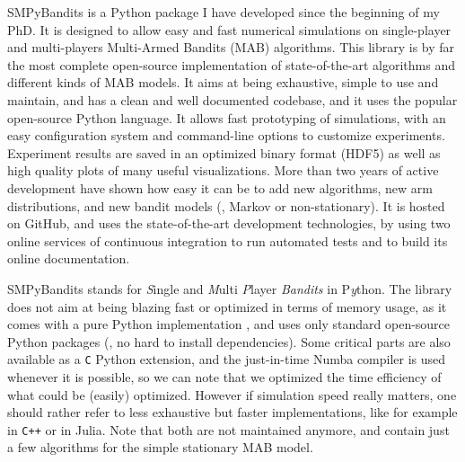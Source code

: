 SMPyBandits is a Python package I have developed since the beginning of my PhD.
It is designed to allow easy and fast numerical simulations on single-player and multi-players Multi-Armed Bandits (MAB) algorithms.
This library is by far the most complete open-source implementation of state-of-the-art algorithms and different kinds of MAB models.
It aims at being exhaustive, simple to use and maintain, and has a clean and well documented codebase, and it uses the popular open-source Python language.
It allows fast prototyping of simulations, with an easy configuration system and command-line options to customize experiments.
Experiment results are saved in an optimized binary format (HDF5) as well as high quality plots of many useful visualizations.
%
More than two years of active development have shown how easy it can be to add new algorithms, new arm distributions, and new bandit models (\eg, Markov or non-stationary).
It is hosted on GitHub, and uses the state-of-the-art development technologies, by using two online services of continuous integration to run automated tests and to build its online documentation.

SMPyBandits stands for \emph{S}ingle and \emph{M}ulti \emph{P}layer \emph{Bandits} in P\emph{y}thon.
The library does not aim at being blazing fast or optimized in terms of memory usage, as it comes with a pure Python implementation \cite{python}, and uses only standard open-source Python packages (\ie, no hard to install dependencies).
Some critical parts are also available as a \texttt{C} Python extension, and the just-in-time Numba compiler \cite{numba} is used whenever it is possible, so we can note that we optimized the time efficiency of what could be (easily) optimized.
However if simulation speed really matters, one should rather refer to less exhaustive but faster implementations, like for example \cite{TorLibbandit} in \texttt{C++} or \cite{VishMABjl} in Julia. Note that both are not maintained anymore, and contain just a few algorithms for the simple stationary MAB model.

